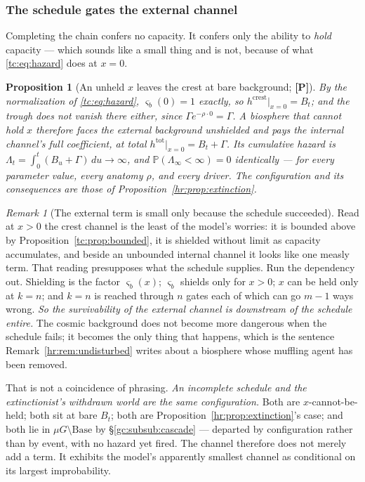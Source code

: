 \documentclass[11pt]{article}
\numberwithin{equation}{section}
\theoremstyle{plain}
\newtheorem{proposition}[theorem]{Proposition}
\theoremstyle{definition}
\theoremstyle{remark}
\newtheorem{remark}[theorem]{Remark}
\newcommand{\PP}{\mathbb{P}}
\begin{document}
\subsubsection{The schedule gates the external channel}
\label{sch:subsub:gating}

Completing the chain confers no capacity. It confers only the ability to
\emph{hold} capacity --- which sounds like a small thing and is not,
because of what \eqref{tc:eq:hazard} does at $x=0$.

\begin{proposition}[An unheld $x$ leaves the crest at bare background;
\textbf{[P]}]\label{sch:prop:gating}
By the normalization of \eqref{tc:eq:hazard}, $\varsigma_b(0)=1$
exactly, so $h^{\mathrm{crest}}\big|_{x=0}=B_t$; and the trough does not
vanish there either, since $\Gamma e^{-\rho\cdot0}=\Gamma$. A biosphere
that cannot hold $x$ therefore faces the external background unshielded
\emph{and} pays the internal channel's full coefficient, at total
$h^{\mathrm{tot}}\big|_{x=0}=B_t+\Gamma$. Its cumulative hazard is
$\Lambda_t=\int_0^t(B_u+\Gamma)\,du\to\infty$, and
$\PP(\Lambda_\infty<\infty)=0$ identically --- for every parameter
value, every anatomy $\rho$, and every driver. The configuration and its
consequences are those of Proposition~\ref{hr:prop:extinction}.
\end{proposition}

\begin{remark}[The external term is small only because the schedule
succeeded]\label{sch:rem:reliance}
Read at $x>0$ the crest channel is the least of the model's worries: it
is bounded above by Proposition~\ref{tc:prop:bounded}, it is shielded
without limit as capacity accumulates, and beside an unbounded internal
channel it looks like one measly term. That reading presupposes what the
schedule supplies. Run the dependency out. Shielding is the factor $\varsigma_b(x)$;
$\varsigma_b$ shields only for $x>0$; $x$ can be held only at $k=n$; and
$k=n$ is reached through $n$ gates each of which can go $m-1$ ways
wrong. \emph{So the survivability of the external channel is downstream
of the schedule entire.} The cosmic background does not become more
dangerous when the schedule fails; it becomes the only thing that
happens, which is the sentence Remark~\ref{hr:rem:undisturbed} writes
about a biosphere whose muffling agent has been removed.

That is not a coincidence of phrasing. \emph{An incomplete schedule and
the extinctionist's withdrawn world are the same configuration.} Both
are $x$-cannot-be-held; both sit at bare $B_t$; both are
Proposition~\ref{hr:prop:extinction}'s case; and both lie in
$\mu G\setminus\mathrm{Base}$ by \S\ref{gc:subsub:cascade} --- departed
by configuration rather than by event, with no hazard yet fired. The
channel therefore does not merely add a term. It exhibits the model's
apparently smallest channel as conditional on its largest improbability.
\end{remark}
\end{document}
